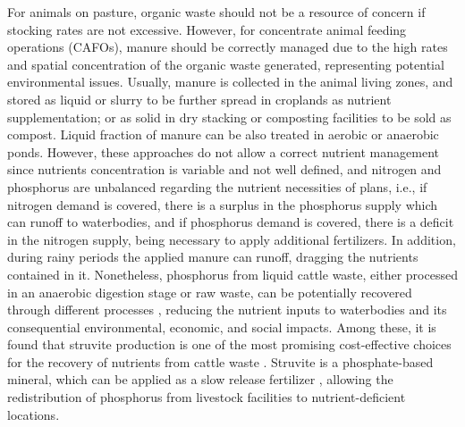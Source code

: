 \documentclass[10pt,a4paper]{article}
\begin{document}
For animals on pasture, organic waste should not be a resource of concern if stocking rates are not excessive. However, for concentrate animal feeding operations (CAFOs), manure should be correctly managed due to the high rates and spatial concentration of the organic waste generated, representing potential environmental issues. Usually, manure is collected in the animal living zones, and stored as liquid or slurry to be further spread in croplands as nutrient supplementation; or as solid in dry stacking or composting facilities to be sold as compost. Liquid fraction of manure can be also treated in aerobic or anaerobic ponds. However, these approaches do not allow a correct nutrient management since nutrients concentration is variable and not well defined, and nitrogen and phosphorus are unbalanced regarding the nutrient necessities of plans, i.e., if nitrogen demand is covered, there is a surplus in the phosphorus supply which can runoff to waterbodies, and if phosphorus demand is covered, there is a deficit in the nitrogen supply, being necessary to apply additional fertilizers. In addition, during rainy periods the applied manure can runoff, dragging the nutrients contained in it. Nonetheless, phosphorus from liquid cattle waste, either processed in an anaerobic digestion stage or raw waste, can be potentially recovered through different processes , reducing the nutrient inputs to waterbodies and its consequential environmental, economic, and social impacts. Among these, it is found that struvite production is one of the most promising cost-effective choices for the recovery of nutrients from cattle waste . Struvite is a phosphate-based mineral, which can be applied as a slow release fertilizer , allowing the redistribution of phosphorus from livestock facilities to nutrient-deficient locations.
\end{document}
